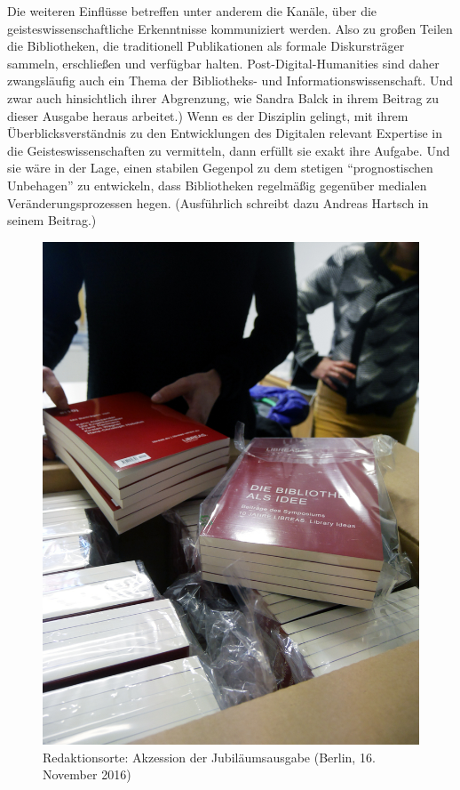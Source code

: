 \documentclass[a4paper,
fontsize=11pt,
oneside,
numbers=noperiodatend,
parskip=half-,
bibliography=totoc,
final
]{scrartcl}
\begin{document}
Die weiteren Einflüsse betreffen unter anderem die Kanäle, über die
geisteswissenschaftliche Erkenntnisse kommuniziert werden. Also zu
großen Teilen die Bibliotheken, die traditionell Publikationen als
formale Diskursträger sammeln, erschließen und verfügbar halten.
Post-Digital-Humanities sind daher zwangsläufig auch ein Thema der
Bibliotheks- und Informationswissenschaft. Und zwar auch hinsichtlich
ihrer Abgrenzung, wie Sandra Balck in ihrem Beitrag zu dieser Ausgabe
heraus arbeitet.) Wenn es der Disziplin gelingt, mit ihrem
Überblicksverständnis zu den Entwicklungen des Digitalen relevant
Expertise in die Geisteswissenschaften zu vermitteln, dann erfüllt sie
exakt ihre Aufgabe. Und sie wäre in der Lage, einen stabilen Gegenpol zu
dem stetigen \enquote{prognostischen Unbehagen} zu entwickeln, dass
Bibliotheken regelmäßig gegenüber medialen Veränderungsprozessen hegen.
(Ausführlich schreibt dazu Andreas Hartsch in seinem Beitrag.)

\begin{figure}
\centering
\includegraphics{redaktionssitzung.jpg}
\caption{Redaktionsorte: Akzession der Jubiläumsausgabe (Berlin, 16.
November 2016)}
\end{figure}
\end{document}
